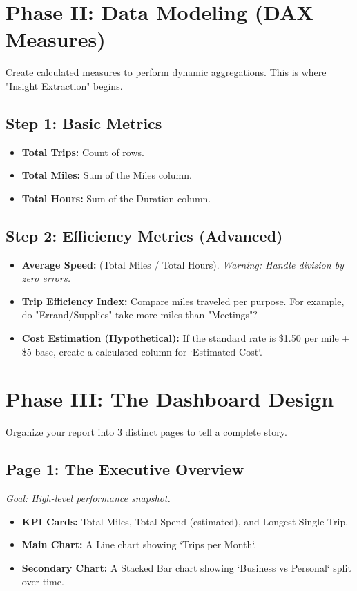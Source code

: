 \section{Phase II: Data Modeling (DAX Measures)}
Create calculated measures to perform dynamic aggregations. This is where "Insight Extraction" begins.

\subsection{Step 1: Basic Metrics}
\begin{itemize}
    \item \textbf{Total Trips:} Count of rows.
    \item \textbf{Total Miles:} Sum of the Miles column.
    \item \textbf{Total Hours:} Sum of the Duration column.
\end{itemize}

\subsection{Step 2: Efficiency Metrics (Advanced)}
\begin{itemize}
    \item \textbf{Average Speed:} (Total Miles / Total Hours). \textit{Warning: Handle division by zero errors.}
    \item \textbf{Trip Efficiency Index:} Compare miles traveled per purpose. For example, do "Errand/Supplies" take more miles than "Meetings"?
    \item \textbf{Cost Estimation (Hypothetical):} If the standard rate is \$1.50 per mile + \$5 base, create a calculated column for `Estimated Cost`.
\end{itemize}

\section{Phase III: The Dashboard Design}
Organize your report into 3 distinct pages to tell a complete story.

\subsection{Page 1: The Executive Overview}
\textit{Goal: High-level performance snapshot.}
\begin{itemize}
    \item \textbf{KPI Cards:} Total Miles, Total Spend (estimated), and Longest Single Trip.
    \item \textbf{Main Chart:} A Line chart showing `Trips per Month`.
    \item \textbf{Secondary Chart:} A Stacked Bar chart showing `Business vs Personal` split over time.
\end{itemize}

